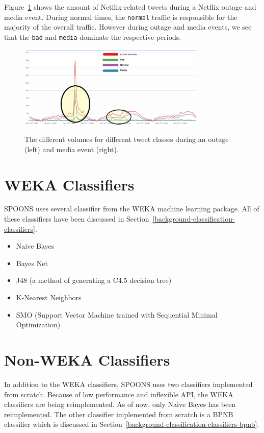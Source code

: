 \documentclass[12pt]{ucthesis}
\newcommand{\captionfonts}{\small\bf\ssp}
\begin{document}

Figure~\ref{fig:groups} shows the amount of Netflix-related tweets during a Netflix outage and media event.
During normal times, the \texttt{normal} traffic is responsible for the majority of the overall traffic.
However during outage and media events, we see that the \texttt{bad} and \texttt{media} dominate the respective
periods.

\begin{figure}
   \begin{center}
      \includegraphics[width=0.8\textwidth]{images/groups.eps}
      \captionfonts
      \caption[SPOONS Groups]{The different volumes for different tweet classes during an outage (left) and media event (right).}
      \label{fig:groups}
   \end{center}
\end{figure}

\section{WEKA Classifiers}
\label{class-weka}
SPOONS uses several classifier from the WEKA machine learning package\cite{weka}.
All of these classifiers have been discussed in Section~\ref{background-classification-classifiers}.

\begin{itemize}
   \item Naive Bayes
   \item Bayes Net
   \item J48 (a method of generating a C4.5 decision tree\cite{j48})
   \item K-Nearest Neighbors
   \item SMO (Support Vector Machine trained with Sequential Minimal Optimization\cite{smo})
\end{itemize}

\section{Non-WEKA Classifiers}
\label{class-nonweka}
In addition to the WEKA classifiers, SPOONS uses two classifiers implemented from scratch.
Because of low performance and inflexible API, the WEKA classifiers are being reimplemented.
As of now, only Naive Bayes has been reimplemented. The other classifier implemented from scratch is
a BPNB classifier which is discussed in Section~\ref{background-classification-classifiers-bpnb}.
\end{document}
